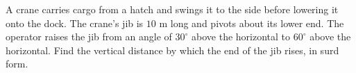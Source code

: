 A crane carries cargo from a hatch and swings it to the side before lowering it onto the dock. The crane's jib is $10$ m long and pivots about its lower end. The operator raises the jib from an angle of $30^\circ$ above the horizontal to $60^\circ$ above the horizontal. Find the vertical distance by which the end of the jib rises, in surd form.
